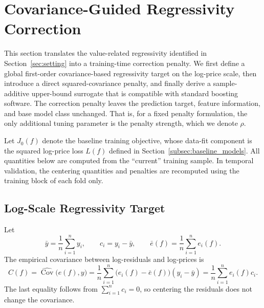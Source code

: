 \documentclass[10pt]{article}
\theoremstyle{definition}
\newcommand{\1}{\mathbf{1}}
\begin{document}
\section{Covariance-Guided Regressivity Correction}
\label{sec:method}


{This section translates the value-related regressivity identified in Section~\ref{sec:setting} into a training-time correction penalty. We first define a global first-order covariance-based regressivity target on the log-price scale, then introduce a direct squared-covariance penalty, and finally derive a sample-additive upper-bound surrogate that is compatible with standard boosting software. The correction penalty leaves the prediction target, feature information, and base model class unchanged. That is, for a fixed penalty formulation, the only additional tuning parameter is the penalty strength, which we denote $\rho$.}

{Let $J_0(f)$ denote the baseline training objective, whose data-fit component is the squared log-price loss $L(f)$ defined in Section~\ref{subsec:baseline_models}. All quantities below are computed from the ``current'' training sample. In temporal validation, the centering quantities and penalties are recomputed using the training block of each fold only.}


\subsection{{Log-Scale Regressivity Target}}
\label{subsec:training_regressivity}

Let
\begin{equation}
\label{eq:centered_log_price}
\bar y=\frac{1}{n}\sum_{i=1}^n y_i,
\qquad
c_i=y_i-\bar y,
\qquad
\bar e(f)=\frac{1}{n}\sum_{i=1}^n e_i(f).
\end{equation}
The empirical covariance between log-residuals and log-prices is
\begin{equation}
\label{eq:training_covariance}
C(f)
=
\widehat{\operatorname{Cov}}\bigl(e(f),y\bigr)
=
\frac{1}{n}\sum_{i=1}^n
\bigl(e_i(f)-\bar e(f)\bigr)(y_i-\bar y)
=
\frac{1}{n}\sum_{i=1}^n e_i(f)c_i.
\end{equation}
The last equality follows from $\sum_{i=1}^n c_i=0$, so centering the residuals does not change the covariance.
\end{document}
